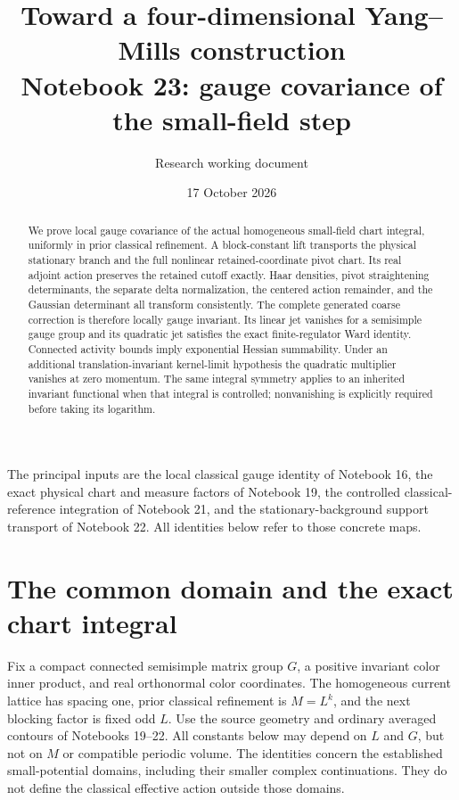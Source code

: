 \documentclass[11pt]{article}
\title{Toward a four-dimensional Yang--Mills construction\\
\large Notebook 23: gauge covariance of the small-field step}
\author{Research working document}
\date{17 October 2026}
\theoremstyle{remark}
\begin{document}
\maketitle
\begin{abstract}
We prove local gauge covariance of the actual homogeneous
small-field chart integral, uniformly in prior classical
refinement. A block-constant lift transports the physical
stationary branch and the full nonlinear retained-coordinate
pivot chart. Its real adjoint action preserves the retained
cutoff exactly. Haar densities, pivot straightening determinants,
the separate delta normalization, the centered action remainder,
and the Gaussian determinant all transform consistently.
The complete generated coarse correction is therefore locally
gauge invariant. Its linear jet vanishes for a semisimple gauge
group and its quadratic jet satisfies the exact finite-regulator
Ward identity. Connected activity bounds imply exponential
Hessian summability. Under an additional translation-invariant
kernel-limit hypothesis the quadratic multiplier vanishes
at zero momentum. The same integral symmetry applies to an
inherited invariant functional when that integral is controlled;
nonvanishing is explicitly required before taking its logarithm.
\end{abstract}

The principal inputs are the local classical gauge identity of
Notebook 16, the exact physical chart and measure factors of
Notebook 19, the controlled classical-reference integration of
Notebook 21, and the stationary-background support transport of
Notebook 22. All identities below refer to those concrete maps.


\section{The common domain and the exact chart integral}
\label{gc-domain}

Fix a compact connected semisimple matrix group $G$, a positive
invariant color inner product, and real orthonormal color coordinates.
The homogeneous current lattice has spacing one, prior classical
refinement is $M=L^k$, and the next blocking factor is fixed odd $L$.
Use the source geometry and ordinary averaged contours of Notebooks
19--22. All constants below may depend on $L$ and $G$, but not on $M$
or compatible periodic volume. The identities concern the established
small-potential domains, including their smaller complex continuations.
They do not define the classical effective action outside those domains.
\end{document}
